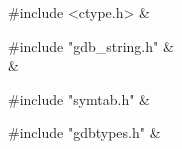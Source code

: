 \medskip
\begin{cxreftabi}
{\stt \#include <ctype.h>} &\\
\end{cxreftabi}

\medskip
\begin{cxreftabi}
{\stt \#include "gdb\_string.h"} &\\
\hspace*{0.2in}{\stt \#include <string.h>} &\\
\end{cxreftabi}

\medskip
\begin{cxreftabi}
{\stt \#include "symtab.h"} &\\
\end{cxreftabi}

\medskip
\begin{cxreftabi}
{\stt \#include "gdbtypes.h"} &\\
\end{cxreftabi}

